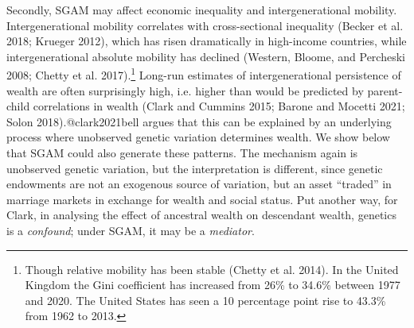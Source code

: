 \documentclass[
]{article}
\theoremstyle{definition}
\theoremstyle{definition}
\theoremstyle{definition}
\theoremstyle{definition}
\theoremstyle{remark}
\begin{document}
Secondly, SGAM may affect economic inequality and intergenerational mobility.
Intergenerational mobility correlates with cross-sectional inequality
(Becker et al. 2018; Krueger 2012), which has risen dramatically in
high-income countries, while intergenerational absolute mobility has declined
(Western, Bloome, and Percheski 2008; Chetty et al. 2017).\footnote{Though relative mobility has been stable (Chetty et al. 2014). In the
  United Kingdom the Gini coefficient has increased from 26\% to 34.6\% between 1977
  and 2020. The United States has seen a 10 percentage point rise to 43.3\%
  from 1962 to 2013.} Long-run estimates of
intergenerational persistence of wealth are often surprisingly high, i.e.
higher than would be predicted by parent-child correlations in wealth
(Clark and Cummins 2015; Barone and Mocetti 2021; Solon 2018).@clark2021bell argues that this can be explained by an underlying
process where unobserved genetic variation determines wealth. We show below that
SGAM could also generate these patterns. The mechanism again is unobserved
genetic variation, but the interpretation is different, since genetic endowments
are not an exogenous source of variation, but an asset ``traded'' in marriage
markets in exchange for wealth and social status. Put another way, for Clark, in
analysing the effect of ancestral wealth on descendant wealth, genetics is a
\emph{confound}; under SGAM, it may be a \emph{mediator}.
\end{document}
